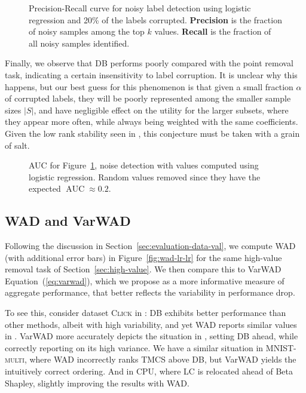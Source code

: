 \documentclass[10pt]{article}
\newcommand{\tmdfn}[1]{\textbf{#1}}
\newcommand{\tmname}[1]{\textsc{#1}}
\newcommand{\tmop}[1]{\ensuremath{\operatorname{#1}}}
\begin{document}
\begin{figure}[h]
  \caption{\label{fig:precision-recall-lr}Precision-Recall curve for noisy
  label detection using logistic regression and 20\% of the labels corrupted.
  {\tmdfn{Precision}} is the fraction of noisy samples among the top $k$
  values. {\tmdfn{Recall}} is the fraction of all noisy samples identified.}
\end{figure}

Finally, we observe that DB performs poorly compared with the point removal
task, indicating a certain insensitivity to label corruption. It is unclear
why this happens, but our best guess for this phenomenon is that given a small
fraction $\alpha$ of corrupted labels, they will be poorly represented among
the smaller sample sizes $|S|$, and have negligible effect on the utility for
the larger subsets, where they appear more often, while always being weighted
with the same coefficients. Given the low rank stability seen in
, this conjecture must be taken with a grain of salt.

\begin{figure}[h]
  \caption{\label{fig:auc-lr}AUC for  Figure~\ref{fig:precision-recall-lr},
  noise detection with values computed using logistic regression. Random
  values removed since they have the expected $\tmop{AUC} \approx 0.2$.}
\end{figure}

\subsection{WAD and VarWAD}\label{sec:wad}

Following the discussion in  Section~\ref{sec:evaluation-data-val}, we compute
WAD (with additional error bars) in  Figure~\ref{fig:wad-lr-lr} for the same
high-value removal task of  Section~\ref{sec:high-value}. We then compare this
to VarWAD  Equation~(\ref{eq:varwad}), which we propose as a more informative
measure of aggregate performance, that better reflects the variability in
performance drop.

To see this, consider dataset {\tmname{Click}} in : DB
exhibits better performance than other methods, albeit with high variability,
and yet WAD reports similar values in . VarWAD more
accurately depicts the situation in , setting DB ahead,
while correctly reporting on its high variance. We have a similar situation in
{\tmname{MNIST-multi}}, where WAD incorrectly ranks TMCS above DB, but VarWAD
yields the intuitively correct ordering. And in {\tmname{CPU}}, where LC is
relocated ahead of Beta Shapley, slightly improving the results with WAD.
\end{document}
